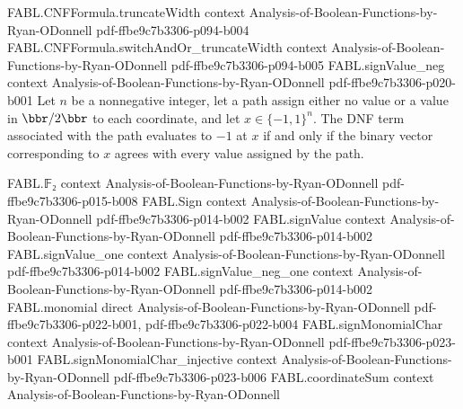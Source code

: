 \begin{theorem}
\proofstep
  {FABL.CNFFormula.truncateWidth}
  {context}
  {Analysis-of-Boolean-Functions-by-Ryan-ODonnell}
  {pdf-ffbe9c7b3306-p094-b004}
\proofstep
  {FABL.CNFFormula.switchAndOr_truncateWidth}
  {context}
  {Analysis-of-Boolean-Functions-by-Ryan-ODonnell}
  {pdf-ffbe9c7b3306-p094-b005}
\proofstep
  {FABL.signValue_neg}
  {context}
  {Analysis-of-Boolean-Functions-by-Ryan-ODonnell}
  {pdf-ffbe9c7b3306-p020-b001}
Let $n$ be a nonnegative integer, let a path assign either no value or a value in
$\bbr/2\bbr$ to each coordinate, and let $x\in\{−1,1\}^n$. The DNF term associated with
the path evaluates to $-1$ at $x$ if and only if the binary vector corresponding to $x$
agrees with every value assigned by the path.
\end{theorem}

\begin{theorem}
\leanok
{}
\proofstep
  {FABL.𝔽₂}
  {context}
  {Analysis-of-Boolean-Functions-by-Ryan-ODonnell}
  {pdf-ffbe9c7b3306-p015-b008}
\proofstep
  {FABL.Sign}
  {context}
  {Analysis-of-Boolean-Functions-by-Ryan-ODonnell}
  {pdf-ffbe9c7b3306-p014-b002}
\proofstep
  {FABL.signValue}
  {context}
  {Analysis-of-Boolean-Functions-by-Ryan-ODonnell}
  {pdf-ffbe9c7b3306-p014-b002}
\proofstep
  {FABL.signValue_one}
  {context}
  {Analysis-of-Boolean-Functions-by-Ryan-ODonnell}
  {pdf-ffbe9c7b3306-p014-b002}
\proofstep
  {FABL.signValue_neg_one}
  {context}
  {Analysis-of-Boolean-Functions-by-Ryan-ODonnell}
  {pdf-ffbe9c7b3306-p014-b002}
\proofstep
  {FABL.monomial}
  {direct}
  {Analysis-of-Boolean-Functions-by-Ryan-ODonnell}
  {pdf-ffbe9c7b3306-p022-b001,
    pdf-ffbe9c7b3306-p022-b004}
\proofstep
  {FABL.signMonomialChar}
  {context}
  {Analysis-of-Boolean-Functions-by-Ryan-ODonnell}
  {pdf-ffbe9c7b3306-p023-b001}
\proofstep
  {FABL.signMonomialChar_injective}
  {context}
  {Analysis-of-Boolean-Functions-by-Ryan-ODonnell}
  {pdf-ffbe9c7b3306-p023-b006}
\proofstep
  {FABL.coordinateSum}
  {context}
  {Analysis-of-Boolean-Functions-by-Ryan-ODonnell}

\end{theorem}
